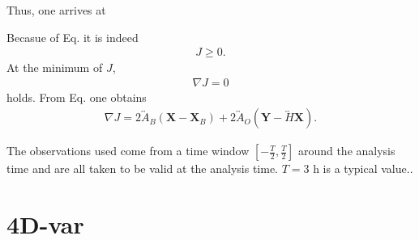 \documentclass{article}
\begin{document}
Thus, one arrives at
%
\begin{center}
\end{center}
%
Becasue of Eq. it is indeed
%
\begin{eqnarray}
J \geq 0.
\end{eqnarray}
%
At the minimum of $J$,
%
\begin{eqnarray}
\nabla J = 0
\end{eqnarray}
%
holds. From Eq. one obtains
%
\begin{eqnarray}
\nabla J = 2\overleftrightarrow{A}_B\left(\mathbf{X} - \mathbf{X}_B\right) + 2\overleftrightarrow{A}_O\left(\mathbf{Y} - \overleftrightarrow{H}\mathbf{X}\right).
\end{eqnarray}

The observations used come from a time window $\left[-\frac{T}{2}, \frac{T}{2}\right]$ around the analysis time and are all taken to be valid at the analysis time. $T = 3$ h is a typical value..

\section{4D-var}
\label{sec:4d-var}
\end{document}
